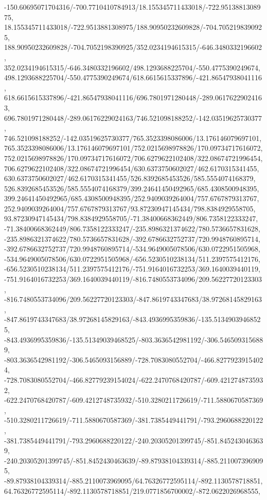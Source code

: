 {    -150.60695071704316/-700.7710410784913/18.155345711433018/-722.9513881308975,
    18.155345711433018/-722.9513881308975/188.90950232609828/-704.7052198390925,
    188.90950232609828/-704.7052198390925/352.0234194615315/-646.3480332196602,
    352.0234194615315/-646.3480332196602/498.1293688225704/-550.4775390249674,
    498.1293688225704/-550.4775390249674/618.6615615337896/-421.86547938041116,
    618.6615615337896/-421.86547938041116/696.7801971280448/-289.06176229024163,
    696.7801971280448/-289.06176229024163/746.521098188252/-142.03519625730377,
    746.521098188252/-142.03519625730377/765.3523398086006/13.176146079697101,
    765.3523398086006/13.176146079697101/752.0215698978826/170.09734717616072,
    752.0215698978826/170.09734717616072/706.6279622102408/322.08674721996454,
    706.6279622102408/322.08674721996454/630.6373750602027/462.6170315341455,
    630.6373750602027/462.6170315341455/526.8392685453526/585.5554074168379,
    526.8392685453526/585.5554074168379/399.24641450492965/685.4308500948395,
    399.24641450492965/685.4308500948395/252.9409039264004/757.6767879313767,
    252.9409039264004/757.6767879313767/93.87230947145434/798.8384929558705,
    93.87230947145434/798.8384929558705/-71.38400668362449/806.7358122333247,
    -71.38400668362449/806.7358122333247/-235.8986321374622/780.5736657831628,
    -235.8986321374622/780.5736657831628/-392.6786632752737/720.9948760895714,
    -392.6786632752737/720.9948760895714/-534.9649005078506/630.0722951505968,
    -534.9649005078506/630.0722951505968/-656.5230510238134/511.2397575412176,
    -656.5230510238134/511.2397575412176/-751.9164016732253/369.1640039440119,
    -751.9164016732253/369.1640039440119/-816.7480553734096/209.56227720123303,
    -816.7480553734096/209.56227720123303/-847.8619743347683/38.97268145829163,
    -847.8619743347683/38.97268145829163/-843.4936995359836/-135.51349039468525,
    -843.4936995359836/-135.51349039468525/-803.3636542981192/-306.5465093156889,
    -803.3636542981192/-306.5465093156889/-728.7083080552704/-466.82779239154024,
    -728.7083080552704/-466.82779239154024/-622.2470768420787/-609.4212748735932,
    -622.2470768420787/-609.4212748735932/-510.3280211726619/-711.5880670587369,
    -510.3280211726619/-711.5880670587369/-381.7385449441791/-793.2960688220122,
    -381.7385449441791/-793.2960688220122/-240.20305201399745/-851.8452430463639,
    -240.20305201399745/-851.8452430463639/-89.87938104339314/-885.2110073969095,
    -89.87938104339314/-885.2110073969095/64.76326772595114/-892.1130578718851,
    64.76326772595114/-892.1130578718851/219.0771856700002/-872.0622026968555,
}
